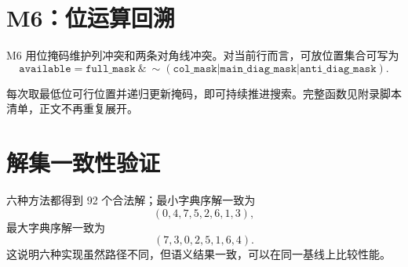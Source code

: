 \section{M6：位运算回溯}

M6 用位掩码维护列冲突和两条对角线冲突。对当前行而言，可放位置集合可写为
\begin{equation}
  \texttt{available}=\texttt{full\_mask}~\&~\sim(\texttt{col\_mask}|\texttt{main\_diag\_mask}|\texttt{anti\_diag\_mask}).
\end{equation}

每次取最低位可行位置并递归更新掩码，即可持续推进搜索。完整函数见附录脚本清单，正文不再重复展开。

\section{解集一致性验证}

六种方法都得到 92 个合法解；最小字典序解一致为
\begin{equation}
  (0,4,7,5,2,6,1,3),
\end{equation}
最大字典序解一致为
\begin{equation}
  (7,3,0,2,5,1,6,4).
\end{equation}
这说明六种实现虽然路径不同，但语义结果一致，可以在同一基线上比较性能。
